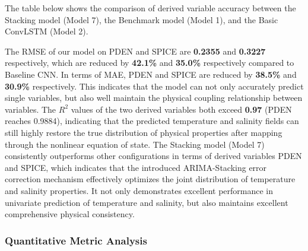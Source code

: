 \documentclass[webpdf,contemporary,large]{oup-authoring-template}
\begin{document}
The table below shows the comparison of derived variable accuracy between the Stacking model (Model 7), the Benchmark model (Model 1), and the Basic ConvLSTM (Model 2).

\begin{table}[H]
\caption{Comparison of RMSE and MAE for Derived Physical Variables Under Different Model Configurations}
\centering
{}
\end{table}

The RMSE of our model on PDEN and SPICE are \textbf{0.2355} and \textbf{0.3227} respectively, which are reduced by \textbf{42.1\%} and \textbf{35.0\%} respectively compared to Baseline CNN. In terms of MAE, PDEN and SPICE are reduced by \textbf{38.5\%} and \textbf{30.9\%} respectively. This indicates that the model can not only accurately predict single variables, but also well maintain the physical coupling relationship between variables. The $R^2$ values of the two derived variables both exceed \textbf{0.97} (PDEN reaches 0.9884), indicating that the predicted temperature and salinity fields can still highly restore the true distribution of physical properties after mapping through the nonlinear equation of state. The Stacking model (Model 7) consistently outperforms other configurations in terms of derived variables PDEN and SPICE, which indicates that the introduced ARIMA-Stacking error correction mechanism effectively optimizes the joint distribution of temperature and salinity properties. It not only demonstrates excellent performance in univariate prediction of temperature and salinity, but also maintains excellent comprehensive physical consistency.

\subsubsection{Quantitative Metric Analysis}
\end{document}
